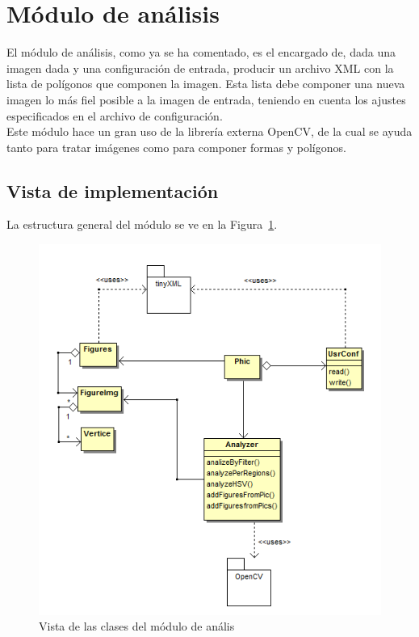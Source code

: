 \section{Módulo de análisis}



El módulo de análisis, como ya se ha comentado, es el encargado de, dada una imagen dada y una configuración de entrada, producir un archivo XML con la lista de polígonos que componen la imagen. Esta lista debe componer una nueva imagen lo más fiel posible a la imagen de entrada, teniendo en cuenta los ajustes especificados en el archivo de configuración.\\

Este módulo hace un gran uso de la librería externa OpenCV, de la cual se ayuda tanto para tratar imágenes como para componer formas y polígonos.

\subsection{Vista de implementación}

La estructura general del módulo se ve en la Figura~\ref{fig:diagramaclasesPHIC}.\\

		\begin{figure}[htbp]
		\centering
		\includegraphics[scale=0.6]{graphics/diagramaclasesPHIC.png}
		\caption{Vista de las clases del módulo de anális}
		\label{fig:diagramaclasesPHIC}
		\end{figure}
		
